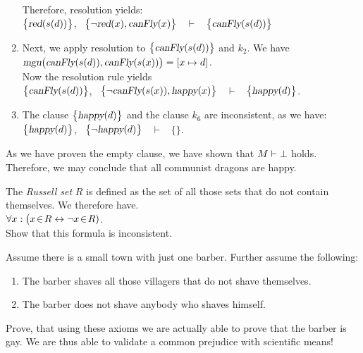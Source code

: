 \begin{enumerate}
      \\[0.2cm]
      Therefore, resolution yields:
      \\[0.2cm]
      \hspace*{1.3cm}
      $\bigl\{\textsl{red}(s(d))\bigl\}$, \ $\bigl\{\neg \textsl{red}(x), \textsl{canFly}(x)\bigl\}$ \ $\vdash$ \ $\bigl\{\textsl{canFly}(s(d))\bigl\}$
\item Next, we apply resolution to $\bigl\{\textsl{canFly}(s(d))\bigl\}$ and 
      $k_2$.  We have
      \\[0.2cm]
      \hspace*{1.3cm}
      $\textsl{mgu}\bigl(\textsl{canFly}(s(d)), \textsl{canFly}(s(x))\bigr) = [x \mapsto d]$.
      \\[0.2cm]
      Now the resolution rule yields
      \\[0.2cm]
      \hspace*{1.3cm}
      $\bigl\{\textsl{canFly}(s(d))\bigl\}$, \ $\bigl\{\neg \textsl{canFly}(s(x)), \textsl{happy}(x)\bigl\}$ \ $\vdash$ \ $\bigl\{\textsl{happy}(d)\bigl\}$.
\item The clause $\bigl\{\textsl{happy}(d)\bigl\}$ and the clause $k_6$ are inconsistent, as we have:
      \\[0.2cm]
      \hspace*{1.3cm}
      $\bigl\{\textsl{happy}(d)\bigl\}$, \  $\bigl\{\neg \textsl{happy}(d)\bigl\}$ \ $\vdash$ \ $\bigl\{\bigl\}$.
\end{enumerate}
As we have proven the empty clause, we have shown  that $M \vdash
\bot$ holds.  Therefore, we may conclude that all communist dragons are happy. 


\exercise
The \emph{Russell set} $R$ is defined as the set of all those sets that do not contain themselves.
We therefore have.
\\[0.2cm]
\hspace*{1.3cm}
$\forall x: \bigl( x \!\in\! R \leftrightarrow \neg x \!\in\! R)$.
\\[0.2cm]
Show that this formula is inconsistent.
\vspace{0.3cm}

\exercise
Assume there is a small town with just one barber.  Further assume the following:
\begin{enumerate}
\item The barber  shaves all those villagers that do not shave themselves.
\item The barber does not shave anybody who shaves himself.
\end{enumerate}
Prove, that using these axioms we are actually able to prove that the barber is gay.
We are thus able to validate a common prejudice with scientific means!


